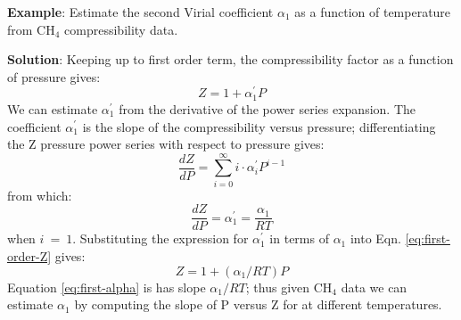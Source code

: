 \documentclass[11pt]{article}
\theoremstyle{definition}
\begin{document}


\clearpage

\begin{mdframed}[backgroundcolor=lgray]
  \noindent\textbf{Example}: Estimate the second Virial coefficient $\alpha_{1}$ as a function of temperature from CH$_{\mathrm{4}}$ compressibility data.

	\vspace{0.2in}

	\noindent\textbf{Solution}:
	Keeping up to first order term, the compressibility factor as a function of pressure gives:
	\begin{equation}\label{eq:first-order-Z}
		Z = 1 + \alpha^{\prime}_{1}P
	\end{equation}We can estimate $\alpha^{\prime}_{1}$ from the derivative of the power series expansion.
	The coefficient $\alpha^{\prime}_{1}$ is the slope of the compressibility versus pressure;
	differentiating the Z pressure power series with respect to pressure gives:
	\begin{equation}
		\frac{dZ}{dP} = \sum_{i=0}^{\infty}i\cdot\alpha^{\prime}_{i}P^{i-1}
	\end{equation}from which:
	\begin{equation}
		\frac{dZ}{dP} = \alpha^{\prime}_{1} = \frac{\alpha_{1}}{RT}
	\end{equation}when $i~=~1$. Substituting the expression for $\alpha^{\prime}_{1}$ in terms of $\alpha_{1}$ into Eqn. \eqref{eq:first-order-Z} gives:
	\begin{equation}\label{eq:first-alpha}
		Z = 1 + \left(\alpha_{1}/RT\right)P
	\end{equation}
	Equation \eqref{eq:first-alpha} is has slope $\alpha_{1}/RT$;
	thus given CH$_{\mathrm{4}}$ data we can estimate $\alpha_{1}$ by computing the slope of P versus Z for at different temperatures. 
\end{mdframed}
\end{document}
